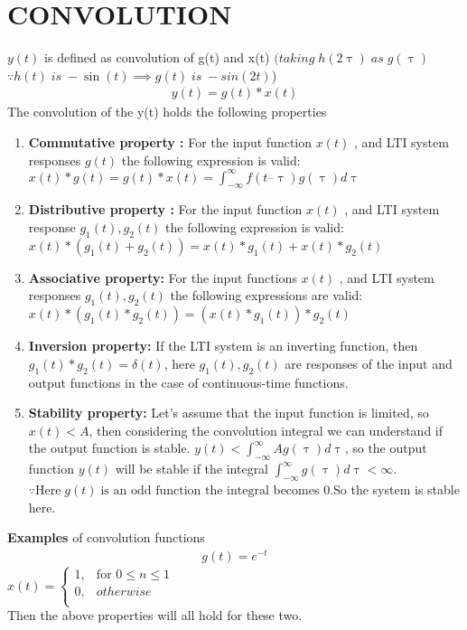 \documentclass[journal,12pt,twocolumn]{IEEEtran}
\begin{document}
\section*{CONVOLUTION}
 $y(t)$ is defined as convolution of g(t) and x(t) $ (taking \; h(2\uptau)\; as\; g(\uptau)$ $\because h(t) \;is \; -\sin(t) \implies g(t) \;is\; -sin(2t)$)
\begin{align}
    y(t) = g(t) * x(t) 
\end{align}
The convolution of the y(t) holds the following properties 
\begin{enumerate}
    \item  \textbf{Commutative property :}  For the input function $x(t)$ , and LTI system responses $g(t)$  the following expression is valid:\\
    $x(t)*g(t)=g(t)*x(t)=\int_{-\infty}^{\infty}f(t–\uptau)g(\uptau)d\uptau$
    \item  \textbf{Distributive property :}
    For the input function $x(t)$ , and LTI system response $g_1(t), g_2(t)$  the following expression is valid:\\ $x(t)*(g_1(t)+g_2(t))=x(t)*g_1(t)+x(t)*g_2(t)$
    \item  \textbf{Associative property:}
    For the input functions $x(t)$ , and LTI system responses $g_1(t), g_2(t)$  the following expressions are valid:\\ $x(t)*(g_1(t)*g_2(t))=(x(t)*g_1(t))*g_2(t)$
    \item \textbf{Inversion property:}
    If the LTI system is an inverting function, then $g_1(t)*g_2(t)=\delta(t) $, here $g_1(t), g_2(t)$ are responses of the input and output functions in the case of continuous-time functions.
    \item \textbf{Stability property:}
    Let’s assume that the input function is limited, so $x(t)<A$, then considering the convolution integral we can understand if the output function is stable. $y(t)<\int_{-\infty}^{\infty} Ag(\uptau)d\uptau$, so the output function $y(t)$ will be stable if the integral $\int_{-\infty}^{\infty} g(\uptau)d\uptau < \infty$. $\because \text{Here} \; g(t) \; \text{is an odd function the integral}$ becomes 0.So the system is stable here.
\end{enumerate}
\textbf{Examples} of convolution functions
\begin{align}
    g(t) = e^{-t}
\end{align}
$x(t)=
 \begin{cases}
    1, & \text{for } 0 \leq n \leq 1 \\
    0, & otherwise\\
  \end{cases}$
  \\Then the above properties will all hold for these two.
\end{document}
